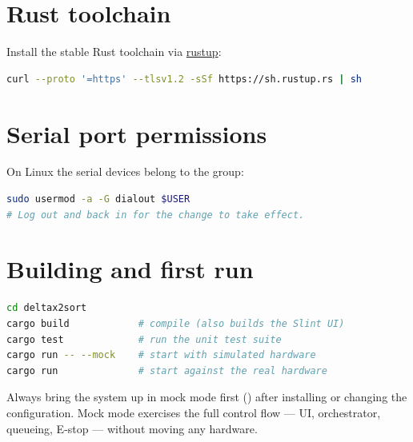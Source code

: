 \section{Rust toolchain}
%
Install the stable Rust toolchain via \href{https://rustup.rs}{rustup}:
\begin{lstlisting}[language=bash]
curl --proto '=https' --tlsv1.2 -sSf https://sh.rustup.rs | sh
\end{lstlisting}

\section{Serial port permissions}
%
On Linux the serial devices belong to the  group:
\begin{lstlisting}[language=bash]
sudo usermod -a -G dialout $USER
# Log out and back in for the change to take effect.
\end{lstlisting}

\section{Building and first run}
%
\begin{lstlisting}[language=bash]
cd deltax2sort
cargo build            # compile (also builds the Slint UI)
cargo test             # run the unit test suite
cargo run -- --mock    # start with simulated hardware
cargo run              # start against the real hardware
\end{lstlisting}

\begin{tipbox}
  Always bring the system up in mock mode first
  () after installing or changing the
  configuration. Mock mode exercises the full control flow --- UI,
  orchestrator, queueing, E-stop --- without moving any hardware.
\end{tipbox}

